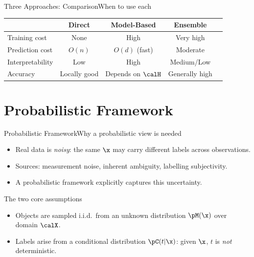 \begin{frame}{Three Approaches: Comparison}{When to use each}
  \begin{table}
    \centering
    \begin{tabular}{lcccc}
      \toprule
      & \textbf{Direct} & \textbf{Model-Based} & \textbf{Ensemble}\\
      \midrule
      Training cost     & None    & High        & Very high\\
      Prediction cost   & $O(n)$  & $O(d)$ (fast) & Moderate\\
      Interpretability  & Low     & High        & Medium/Low\\
      Accuracy          & Locally good & Depends on $\calH$ & Generally high\\
      \bottomrule
    \end{tabular}
  \end{table}
\end{frame}

\section{Probabilistic Framework}

\begin{frame}{Probabilistic Framework}{Why a probabilistic view is needed}
  \begin{itemize}
    \item Real data is \emph{noisy}: the same $\x$ may carry different labels across
          observations.
    \item Sources: measurement noise, inherent ambiguity, labelling subjectivity.
    \item A probabilistic framework explicitly captures this uncertainty.
  \end{itemize}
  \bigskip
  \begin{block}{The two core assumptions}
    \begin{itemize}
      \item Objects are sampled i.i.d.\ from an unknown distribution $\pM(\x)$ over
            domain $\calX$.
      \item Labels arise from a conditional distribution $\pC(t|\x)$: given $\x$, $t$ is
            \emph{not} deterministic.
    \end{itemize}
  \end{block}
\end{frame}

